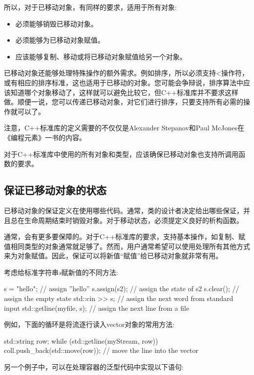所以，对于已移动对象，有同样的要求，适用于所有对象:

\begin{itemize}
	\item 必须能够销毁已移动对象。
	\item 必须能够为已移动对象赋值。
	\item 应该能够复制、移动或将已移动对象赋值给另一个对象。
\end{itemize}

已移动对象还能够处理特殊操作的额外需求。例如排序，所以必须支持<操作符，或有相应的排序标准，这也适用于已移动的对象。您可能会争辩说，排序算法中应该知道哪个对象移动了，这样就可以避免比较它，但C++标准库并不要求这样做。顺便一说，您可以传递已移动对象，对它们进行排序，只要支持所有必需的操作就可以了。

注意，C++标准库的定义需要的不仅仅是Alexander Stepanov和Paul McJones在《编程元素》一书的内容。

对于C++标准库中使用的所有对象和类型，应该确保已移动对象也支持所调用函数的要求。

\subsection{保证已移动对象的状态}

已移动对象的保证定义在使用哪些代码。通常，类的设计者决定给出哪些保证，并且总在生命周期结束时销毁对象。对于移动状态，必须提定义良好的析构函数。

通常，会有更多要保障的。对于C++标准库的要求，支持基本操作，如复制、赋值相同类型的对象通常就足够了。然而，用户通常希望可以使用处理所有其他方式来为对象赋值。因此，保证可以将新值“赋值”给已移动对象就非常有用。

考虑给标准字符串\textit{s}赋新值的不同方法:

\begin{cppcode}
s = "hello"; // assign ”hello”
s.assign(s2); // assign the state of s2
s.clear(); // assign the empty state
std::cin >> s; // assign the next word from standard input
std::getline(myfile, s); // assign the next line from a file
\end{cppcode}

例如，下面的循环是将流逐行读入vector对象的常用方法:

\begin{cppcode}
std::string row;
while (std::getline(myStream, row)) {
	coll.push_back(std::move(row)); // move the line into the vector
}
\end{cppcode}

另一个例子中，可以在处理容器的泛型代码中实现以下语句:

